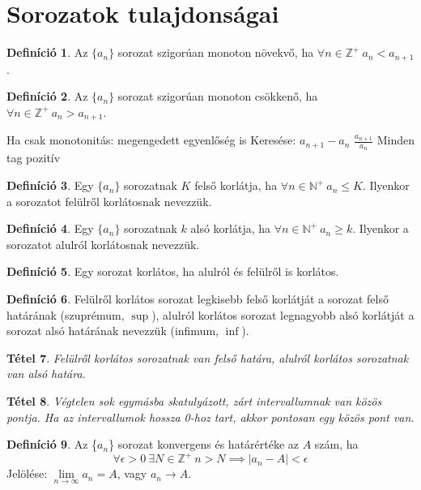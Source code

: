 \documentclass[twoside,12pt]{report}
\newtheorem{theorem}{Tétel}[section]
\theoremstyle{definition}
\newtheorem{definition}[theorem]{Definíció}
\begin{document}
\section{Sorozatok tulajdonságai}
	\begin{definition}
		Az $\{a_n\}$ sorozat szigorúan monoton növekvő, ha $\forall n\in\mathbb{Z}^+\ a_n<a_{n+1}$.
	\end{definition}
	\begin{definition}
		Az $\{a_n\}$ sorozat szigorúan monoton csökkenő, ha $\forall n\in\mathbb{Z}^+\ a_n>a_{n+1}$.
	\end{definition}
	\begin{outline}
		\1 Ha csak monotonitás: megengedett egyenlőség is
		\1 Keresése:
			\2 $a_{n+1}-a_n$
			\2 $\frac{a_{n+1}}{a_n}$
				\3 Minden tag pozitív
	\end{outline}
	\begin{definition}
		Egy $\{a_n\}$ sorozatnak $K$ felső korlátja, ha $\forall n\in\mathbb{N}^+\ a_n\le K$. Ilyenkor a sorozatot felülről korlátosnak nevezzük.
	\end{definition}
	\begin{definition}
		Egy $\{a_n\}$ sorozatnak $k$ alsó korlátja, ha $\forall n\in\mathbb{N}^+\ a_n\ge k$. Ilyenkor a sorozatot alulról korlátosnak nevezzük.
	\end{definition}
	\begin{definition}
		Egy sorozat korlátos, ha alulról és felülről is korlátos.
	\end{definition}
	\begin{definition}
		Felülről korlátos sorozat legkisebb felső korlátját a sorozat felső határának (szuprémum, $\sup$), alulról korlátos sorozat legnagyobb alsó korlátját a sorozat alsó határának nevezzük (infimum, $\inf$).
	\end{definition}
	\begin{theorem}
		Felülről korlátos sorozatnak van felső határa, alulról korlátos sorozatnak van alsó határa.
	\end{theorem}
	\begin{theorem}
		Végtelen sok egymásba skatulyázott, zárt intervallumnak van közös pontja. Ha az intervallumok hossza 0-hoz tart, akkor pontosan egy közös pont van.
	\end{theorem}
	\begin{definition}
		Az \{$a_n$\} sorozat konvergens és határértéke az $A$ szám, ha
		\begin{equation*}
			\forall\epsilon>0\ \exists N\in\mathbb{Z}^+\ n>N\implies|a_n-A|<\epsilon
		\end{equation*}
		Jelölése: $\lim\limits_{n\rightarrow\infty}a_n=A$, vagy $a_n\rightarrow A$.
	\end{definition}
\end{document}
